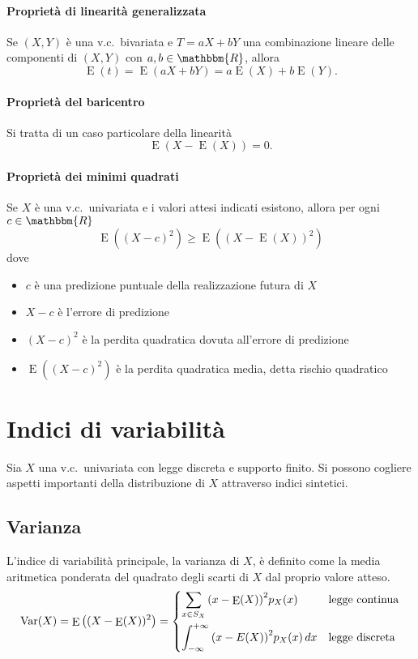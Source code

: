 \documentclass[11pt,a4paper,twoside]{article}
\let\geq\geqslant%
\newcommand\R{\mathbbm{R}}
\newcommand\dx{\,dx}
\DeclareMathOperator{\Var}{Var}
\DeclareMathOperator{\E}{E}
\begin{document}
\paragraph{Proprietà di linearità generalizzata} Se \((X, Y)\) è una
v.c.\ bivariata e \(T = aX + bY\) una combinazione lineare delle
componenti di \((X, Y)\) con \(a, b \in \R\), allora
\[
  \E(t) = \E(aX + bY) = a\E(X) + b\E(Y).
\]

\paragraph{Proprietà del baricentro} Si tratta di un caso particolare
della linearità
\[
  \E(X - \E(X)) = 0.
\]

\paragraph{Proprietà dei minimi quadrati} Se \(X\) è una v.c.\
univariata e i valori attesi indicati esistono, allora per ogni
\(c\in\R\)
\[
  \E\left( (X-c)^2 \right) \geq \E\left( (X - \E(X))^2 \right)
\]
dove
\begin{itemize}
\item \(c\) è una predizione puntuale della realizzazione futura di
  \(X\)
\item \(X-c\) è l'errore di predizione
\item \( (X-c)^2 \) è la perdita quadratica dovuta all'errore di
  predizione
\item \(\E((X-c)^2)\) è la perdita quadratica media, detta rischio quadratico
\end{itemize}

\section{Indici di variabilità}
Sia \(X\) una v.c.\ univariata con legge discreta e supporto finito.
Si possono cogliere aspetti importanti della distribuzione di \(X\)
attraverso indici sintetici.

\subsection{Varianza}
L'indice di variabilità principale, la varianza di \(X\), è definito
come la media aritmetica ponderata del quadrato degli scarti di \(X\)
dal proprio valore atteso.
\[
  \Var(X) = \E\left( (X - \E(X))^2 \right) = \begin{dcases}
    \sum_{x\in S_X}{(x - \E(X))}^2 p_X(x) & \mbox{legge continua} \\
    \int_{-\infty}^{+\infty} {(x - E(X))}^2 p_X(x) \dx & \mbox{legge
      discreta}
  \end{dcases}
\]
\end{document}
